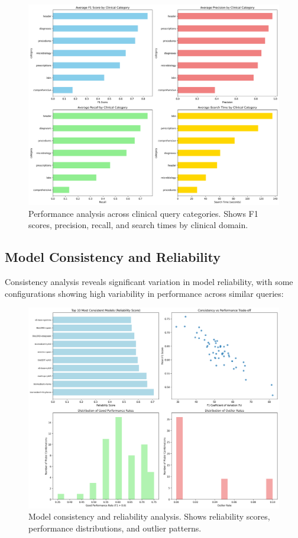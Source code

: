 \begin{figure}[!htbp]
  \centering
  \includegraphics[width=\textwidth]{chap4_results/images/category_performance_analysis.png}
  \caption{Performance analysis across clinical query categories. Shows F1 scores, precision, recall, and search times by clinical domain.}
  \label{fig:category_analysis}
\end{figure}

\subsection{Model Consistency and Reliability}


Consistency analysis reveals significant variation in model reliability, with some configurations showing high variability in performance across similar queries:

\begin{figure}[!htbp]
  \centering
  \includegraphics[width=\textwidth]{chap4_results/images/consistency_reliability_analysis.png}
  \caption{Model consistency and reliability analysis. Shows reliability scores, performance distributions, and outlier patterns.}
  \label{fig:consistency_analysis}
\end{figure}

